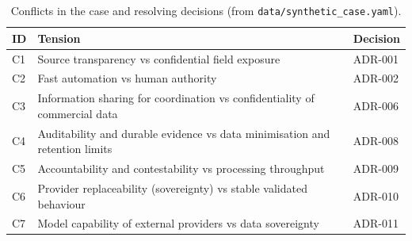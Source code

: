 \begin{table}[t]
\centering\small
\caption{Conflicts in the case and resolving decisions (from \texttt{data/synthetic\_case.yaml}).}\label{tab:conflicts}
\begin{tabularx}{\columnwidth}{@{}lXl@{}}
\toprule
ID & Tension & Decision\\
\midrule
C1 & Source transparency vs confidential field exposure & ADR-001\\
C2 & Fast automation vs human authority & ADR-002\\
C3 & Information sharing for coordination vs confidentiality of commercial data & ADR-006\\
C4 & Auditability and durable evidence vs data minimisation and retention limits & ADR-008\\
C5 & Accountability and contestability vs processing throughput & ADR-009\\
C6 & Provider replaceability (sovereignty) vs stable validated behaviour & ADR-010\\
C7 & Model capability of external providers vs data sovereignty & ADR-011\\
\bottomrule
\end{tabularx}
\end{table}

